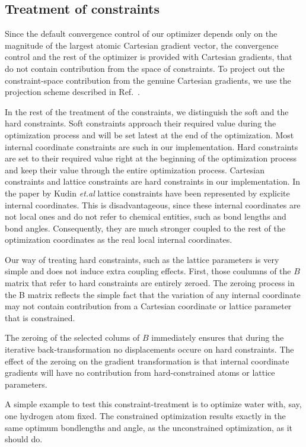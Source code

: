 \documentclass[prl,aps,preprint,superbib,12pt]{revtex4}
\begin{document}
\subsection{Treatment of constraints}
Since the default convergence control of our optimizer
depends only on the magnitude of the largest atomic Cartesian gradient  
vector, the convergence control and the rest of the optimizer
is provided with Cartesian gradients, that do not contain contribution
from the space of constraints. To project out the constraint-space
contribution from the genuine Cartesian gradients, we use the 
projection scheme described in Ref.~.

In the rest of the treatment of the constraints, we distinguish
the soft and the hard constraints.
Soft constraints approach their required value during the
optimization process and will be set latest at the end of the
optimization. Most internal coordinate constraints are such
in our implementation. Hard constraints are set to their required
value right at the beginning of the optimization process and keep their
value through the entire optimization process. 
Cartesian constraints and lattice constraints are hard constraints 
in our implementation. In the paper by Kudin {\it et.al} \cite{KKudin01}
lattice constraints have been represented by explicite internal
coordinates. This is disadvantageous, since these internal coordinates 
are not local ones and do not refer to chemical entities, such as bond
lengths and bond angles. Consequently, they are much stronger coupled
to the rest of the optimization coordinates as the real local internal 
coordinates.

Our way of treating hard constraints, such as the lattice parameters
is very simple and does not induce extra coupling effects. 
First, those coulumns of the $B$ matrix that refer 
to hard constraints are entirely zeroed. 
The zeroing process in the B matrix reflects the simple fact 
that the variation of any internal coordinate may not contain 
contribution from a Cartesian coordinate or lattice parameter 
that is constrained.

The zeroing of the selected colums of $B$ immediately
ensures that during the iterative back-transformation 
\cite{PPulay77} no displacements occure on hard constraints.
The effect of the zeroing on the gradient transformation is that
internal coordinate gradients will have 
no contribution from 
hard-constrained atoms or lattice parameters.

A simple example to test this constraint-treatment is to optimize water
with, say, one hydrogen atom fixed. The constrained optimization
results exactly in the same optimum bondlengths and angle, 
as the unconstrained optimization, as it should do.
\end{document}
